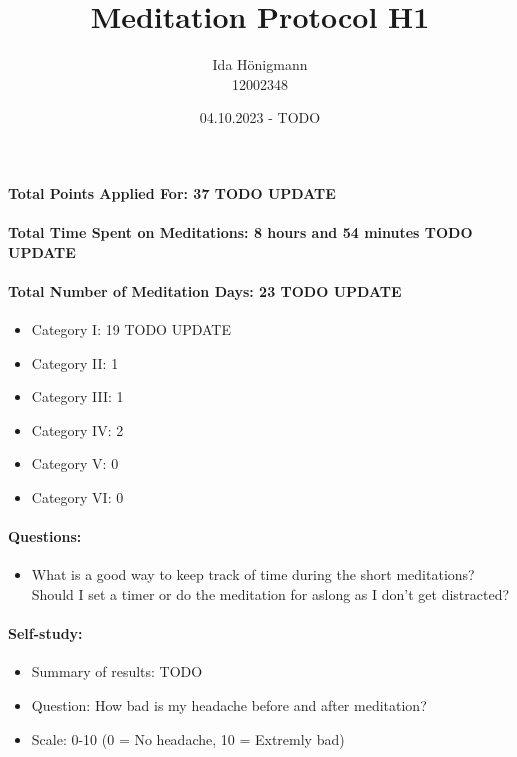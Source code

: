 \documentclass[11pt,a4paper]{article}
\begin{document}
\afterpage{\restorepagecolor}
\title{\LARGE\bfseries Meditation Protocol H1}
\author{Ida Hönigmann \\ 12002348}
\date{04.10.2023 - TODO}
\maketitle

\paragraph{Total Points Applied For: 37 TODO UPDATE}
\paragraph{Total Time Spent on Meditations: 8 hours and 54 minutes TODO UPDATE}
\paragraph{Total Number of Meditation Days: 23 TODO UPDATE}

\begin{itemize}
    \item Category I: 19 TODO UPDATE
    \item Category II: 1
    \item Category III: 1
    \item Category IV: 2
    \item Category V: 0
    \item Category VI: 0
\end{itemize}

\paragraph{Questions:}
\begin{itemize}
    \item What is a good way to keep track of time during the short meditations? Should I set a timer or do the meditation for aslong as I don't get distracted?
\end{itemize}

\paragraph{Self-study:}
\begin{itemize}
    \item Summary of results: TODO
    \item Question: How bad is my headache before and after meditation?
    \item Scale: 0-10 (0 = No headache, 10 = Extremly bad)
\end{itemize}
\end{document}
